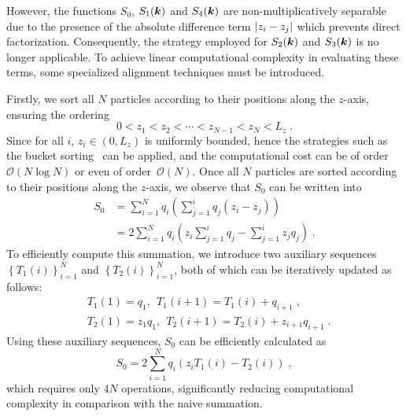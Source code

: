However, the functions $S_0$,  $S_1(\bm{k})$ and $S_4(\bm{k})$  are non-multiplicatively separable due to the presence of the absolute difference term $\lvert z_i - z_j\rvert$ which prevents direct factorization. Consequently, the strategy employed for 
$S_2(\bm{k})$ and $S_3(\bm{k})$ is no longer applicable. To achieve linear computational complexity in evaluating these terms,  some specialized alignment techniques must be introduced.

Firstly, we sort all $N$ particles according to their positions along the 
$z$-axis, ensuring the ordering
\begin{equation*}
   0 < z_1 < z_2 <  \cdots <  z_{N - 1}<z_N < L_z\;.
\end{equation*}
Since for all  $i$, $z_i \in (0, L_z)$ is uniformly bounded, hence  the strategies such as the bucket sorting~\cite{corwin2004sorting} can be applied, and the computational cost can be of order~$\mathcal{O}(N \log{N})$ or even  of order~$\mathcal{O}(N)$. Once all $N$ particles are sorted according to their positions along the 
$z$-axis, we observe that $S_0$ can be written into
\begin{align*}
    S_0 
    & = \sum_{i = 1}^N q_i \left( \sum_{j = 1}^{i }{q_j (z_i - z_j)} \right) \\
    & = 2 \sum_{i = 1}^N q_i \left( z_i \sum_{j = 1}^{i }q_j - \sum_{j = 1}^{i }z_j q_j  \right) \;.
\end{align*}
To efficiently compute this summation, we introduce two auxiliary sequences  $\left\{T_1(i)\right\}_{i=1}^N$ and $\left\{T_2(i)\right\}_{i=1}^N$, both of which  can be iteratively updated as follows:
\begin{align*}
    &T_1(1)=q_1,~~T_1(i+1)=T_1(i)+q_{i+1}\;,\\
    &T_2(1)=z_1q_1,~~T_2(i+1)=T_2(i)+z_{i+1}q_{i+1}\;.
\end{align*}
Using these auxiliary sequences, 
$S_0$ can be efficiently calculated as
\[
S_0= 2 \sum_{i = 1}^N q_i \left( z_iT_1(i)-T_2(i)\right)\;,
\]
which requires only 
$4N$ operations, significantly reducing computational complexity in comparison with the naive summation.


